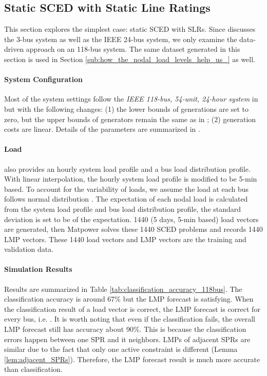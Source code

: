 \documentclass[letterpaper, 11pt]{article}
\theoremstyle{plain}
\theoremstyle{definition}
\begin{document}
\subsection{Static SCED with Static Line Ratings} \label{sub:case_studies_of_static_sced_with_static_line_ratings}
This section explores the simplest case: static SCED with SLRs. Since \cite{Geng2015} discusses the 3-bus system as well as the IEEE 24-bus system, we only examine the data-driven approach on an 118-bus system. The same dataset generated in this section is used in Section \ref{sub:how_the_nodal_load_levels_help_us_} as well.

\paragraph{System Configuration} \label{par:system_configuration}
Most of the system settings follow the \emph{IEEE 118-bus, 54-unit, 24-hour system} in \cite{Technology} but with the following changes: (1) the lower bounds of generations are set to zero, but the upper bounds of generators remain the same as in \cite{Technology}; (2) generation costs are linear. Details of the parameters are summarized in \cite{Geng2015c}.



\paragraph{Load} \label{par:Load}
\cite{Technology} also provides an hourly system load profile and a bus load distribution profile. With linear interpolation, the hourly system load profile is modified to be 5-min based. To account for the variability of loads, we assume the load at each bus follows normal distribution . The expectation  of each nodal load is calculated from the system load profile and bus load distribution profile, the standard deviation  is set to be  of the expectation. 1440 (5 days, 5-min based) load vectors are generated, then Matpower \cite{zimmerman2011matpower} solves these 1440 SCED problems and records 1440 LMP vectors. These 1440 load vectors and LMP vectors are the training and validation data.


\paragraph{Simulation Results} \label{par:simulation_results}
Results are summarized in Table \ref{tab:classification_accuracy_118bus}.
The classification accuracy is around 67\% but the LMP forecast is satisfying. When the classification result of a load vector is correct, the LMP forecast is correct for every bus, i.e. . 
It is worth noting that even if the classification fails, the overall LMP forecast still has accuracy about 90\%. This is because the classification errors happen between one SPR and it neighbors. LMPs of adjacent SPRs are similar due to the fact that only one active constraint is different (Lemma \ref{lem:adjacent_SPRs}). Therefore, the LMP forecast result is much more accurate than classification.
\end{document}
